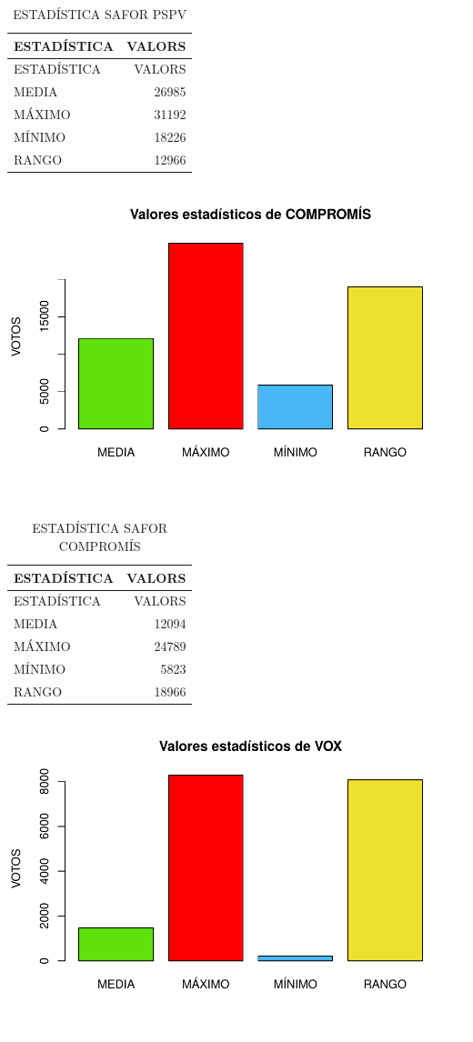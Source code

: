 \documentclass[
]{article}
\begin{document}
\begin{longtable}[]{@{}lr@{}}
\caption{ESTADÍSTICA SAFOR PSPV}\tabularnewline
\toprule\noalign{}
ESTADÍSTICA & VALORS \\
\midrule\noalign{}
\endfirsthead
\toprule\noalign{}
ESTADÍSTICA & VALORS \\
\midrule\noalign{}
\endhead
\bottomrule\noalign{}
\endlastfoot
MEDIA & 26985 \\
MÁXIMO & 31192 \\
MÍNIMO & 18226 \\
RANGO & 12966 \\
\end{longtable}

\includegraphics{SAFOR_files/figure-latex/6-3.pdf}

\begin{longtable}[]{@{}lr@{}}
\caption{ESTADÍSTICA SAFOR COMPROMÍS}\tabularnewline
\toprule\noalign{}
ESTADÍSTICA & VALORS \\
\midrule\noalign{}
\endfirsthead
\toprule\noalign{}
ESTADÍSTICA & VALORS \\
\midrule\noalign{}
\endhead
\bottomrule\noalign{}
\endlastfoot
MEDIA & 12094 \\
MÁXIMO & 24789 \\
MÍNIMO & 5823 \\
RANGO & 18966 \\
\end{longtable}

\includegraphics{SAFOR_files/figure-latex/6-4.pdf}
\end{document}
